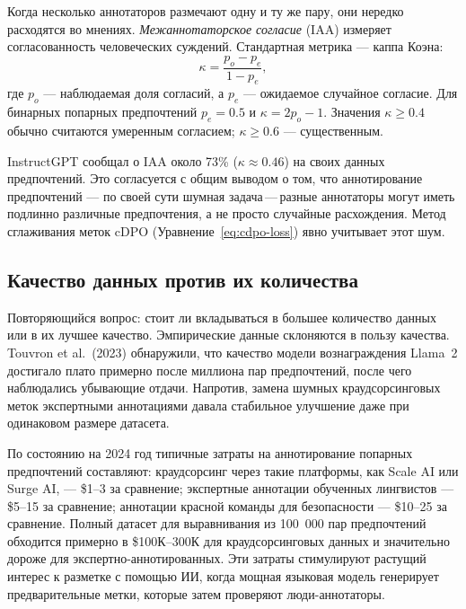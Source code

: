 Когда несколько аннотаторов размечают одну и ту же пару, они нередко расходятся во мнениях. \emph{Межаннотаторское согласие} (IAA) измеряет согласованность человеческих суждений. Стандартная метрика --- каппа Коэна:
\[
\kappa = \frac{p_o - p_e}{1 - p_e},
\]
где $p_o$ --- наблюдаемая доля согласий, а $p_e$ --- ожидаемое случайное согласие. Для бинарных попарных предпочтений $p_e = 0.5$ и $\kappa = 2p_o - 1$. Значения $\kappa \geq 0.4$ обычно считаются умеренным согласием; $\kappa \geq 0.6$ --- существенным.

InstructGPT сообщал о IAA около 73\% ($\kappa \approx 0.46$) на своих данных предпочтений. Это согласуется с общим выводом о том, что аннотирование предпочтений --- по своей сути шумная задача\,---\,разные аннотаторы могут иметь подлинно различные предпочтения, а не просто случайные расхождения. Метод сглаживания меток cDPO (Уравнение~\eqref{eq:cdpo-loss}) явно учитывает этот шум.

\subsection{Качество данных против их количества}
\label{sec:data-quality-quantity}

Повторяющийся вопрос: стоит ли вкладываться в большее количество данных или в их лучшее качество. Эмпирические данные склоняются в пользу качества. Touvron et al.\ (2023) обнаружили, что качество модели вознаграждения Llama~2 достигало плато примерно после миллиона пар предпочтений, после чего наблюдались убывающие отдачи. Напротив, замена шумных краудсорсинговых меток экспертными аннотациями давала стабильное улучшение даже при одинаковом размере датасета.

\begin{remark}
\label{rem:data-costs}
По состоянию на 2024 год типичные затраты на аннотирование попарных предпочтений составляют: краудсорсинг через такие платформы, как Scale AI или Surge AI, --- \$1--3 за сравнение; экспертные аннотации обученных лингвистов --- \$5--15 за сравнение; аннотации красной команды для безопасности --- \$10--25 за сравнение. Полный датасет для выравнивания из 100~000 пар предпочтений обходится примерно в \$100К--300К для краудсорсинговых данных и значительно дороже для экспертно-аннотированных. Эти затраты стимулируют растущий интерес к разметке с помощью ИИ, когда мощная языковая модель генерирует предварительные метки, которые затем проверяют люди-аннотаторы.
\end{remark}

